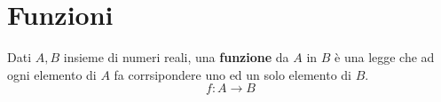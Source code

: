 \documentclass[../../main.tex]{subfiles}
\begin{document}
\section{Funzioni}
Dati $A, B$ insieme di numeri reali, una \textbf{funzione} da $A$ in $B$ è una
legge che ad ogni elemento di $A$ fa corrsipondere uno ed un solo elemento di
$B$.
\[
    f: A \rightarrow B
\]
\end{document}
